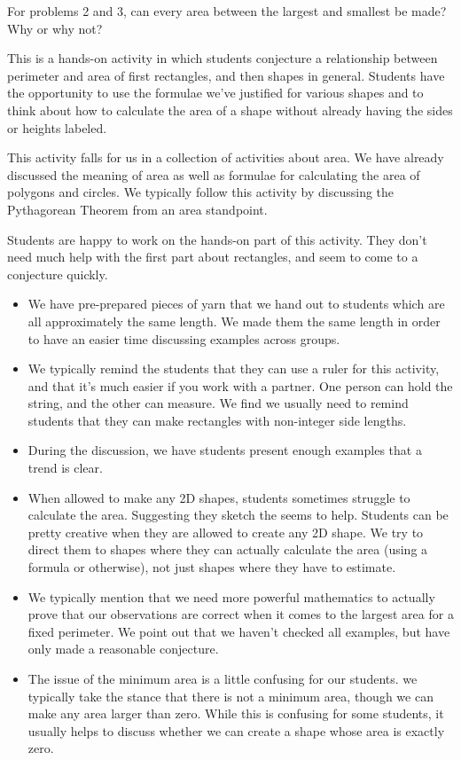 \documentclass[nooutcomes]{ximera}
\begin{document}
\begin{problem} For problems 2 and 3, can every area between the largest and smallest be made?  Why or why not?

\end{problem}

\newpage
\begin{instructorNotes}
This is a hands-on activity in which students conjecture a relationship between perimeter and area of first rectangles, and then shapes in general.  Students have the opportunity to use the formulae we've justified for various shapes and to think about how to calculate the area of a shape without already having the sides or heights labeled.

This activity falls for us in a collection of activities about area.  We have already discussed the meaning of area as well as formulae for calculating the area of polygons and circles.  We typically follow this activity by discussing the Pythagorean Theorem from an area standpoint.

Students are happy to work on the hands-on part of this activity.  They don't need much help with the first part about rectangles, and seem to come to a conjecture quickly.
\begin{itemize}
    \item We have pre-prepared pieces of yarn that we hand out to students which are all approximately the same length.  We made them the same length in order to have an easier time discussing examples across groups.
    \item We typically remind the students that they can use a ruler for this activity, and that it's much easier if you work with a partner.  One person can hold the string, and the other can measure.  We find we usually need to remind students that they can make rectangles with non-integer side lengths.
	\item During the discussion, we have students present enough examples that a trend is clear.  
    \item 	When allowed to make any 2D shapes, students sometimes struggle to calculate the area.  Suggesting they sketch the seems to help.  Students can be pretty creative when they are allowed to create any 2D shape.  We try to direct them to shapes where they can actually calculate the area (using a formula or otherwise), not just shapes where they have to estimate.
	\item We typically mention that we need more powerful mathematics to actually prove that our observations are correct when it comes to the largest area for a fixed perimeter.  We point out that we haven't checked all examples, but have only made a reasonable conjecture.
	\item The issue of the minimum area is a little confusing for our students.  we typically take the stance that there is not a minimum area, though we can make any area larger than zero.  While this is confusing for some students, it usually helps to discuss whether we can create a shape whose area is exactly zero.
\end{itemize}








\end{instructorNotes}
\end{document}
